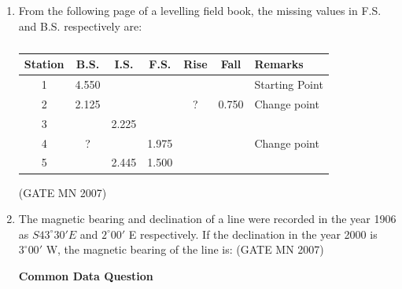 \documentclass[journal]{IEEEtran}
\begin{document}
\begin{enumerate}
\item From the following page of a levelling field book, the missing values in F.S. and B.S. respectively are:

\begin{table}[H]
    \centering\normalsize
\begin{tabular}{|c|c|c|c|c|c|l|}
\hline
Station & B.S. & I.S. & F.S. & Rise & Fall & Remarks \\
\hline
1 & 4.550 &     &     &      &      & Starting Point \\
\hline
2 & 2.125 &     &     &  ?    & 0.750 & Change point \\
\hline
3 &       & 2.225 &     &      &      &  \\
\hline
4 &    ?   &     & 1.975 &      &      & Change point \\
\hline
5 &       & 2.445 & 1.500 &      &      &  \\
\hline
\end{tabular}
    \caption{}
    \label{tab:Q69}
\end{table}
\hfill (GATE MN 2007)
\begin{enumerate}
\end{enumerate}


\item The magnetic bearing and declination of a line were recorded in the year 1906 as $S43^\circ 30' E$ and $2^\circ 00'$ E respectively. If the declination in the year 2000 is $3^\circ 00'$ W, the magnetic bearing of the line is:
	\hfill (GATE MN 2007)
\begin{enumerate}
\end{enumerate}


\begin{center}
	\textbf{Common Data Question}
\end{center}


\end{enumerate}
\end{document}

